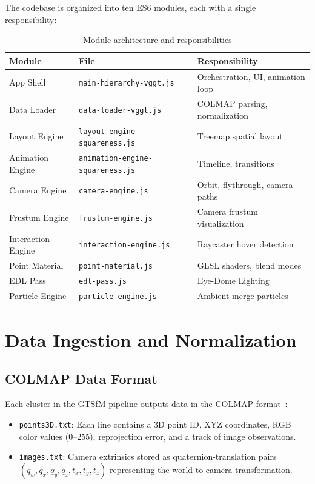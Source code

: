 \documentclass[11pt, letterpaper]{article}
\begin{document}
The codebase is organized into ten ES6 modules, each with a single responsibility:

\begin{table}[H]
\centering
\caption{Module architecture and responsibilities}
\begin{tabular}{@{}lll@{}}
\toprule
\textbf{Module} & \textbf{File} & \textbf{Responsibility} \\
\midrule
App Shell & \texttt{main-hierarchy-vggt.js} & Orchestration, UI, animation loop \\
Data Loader & \texttt{data-loader-vggt.js} & COLMAP parsing, normalization \\
Layout Engine & \texttt{layout-engine-squareness.js} & Treemap spatial layout \\
Animation Engine & \texttt{animation-engine-squareness.js} & Timeline, transitions \\
Camera Engine & \texttt{camera-engine.js} & Orbit, flythrough, camera paths \\
Frustum Engine & \texttt{frustum-engine.js} & Camera frustum visualization \\
Interaction Engine & \texttt{interaction-engine.js} & Raycaster hover detection \\
Point Material & \texttt{point-material.js} & GLSL shaders, blend modes \\
EDL Pass & \texttt{edl-pass.js} & Eye-Dome Lighting \\
Particle Engine & \texttt{particle-engine.js} & Ambient merge particles \\
\bottomrule
\end{tabular}
\end{table}

\section{Data Ingestion and Normalization}

\subsection{COLMAP Data Format}

Each cluster in the GTSfM pipeline outputs data in the COLMAP format~\cite{colmap}:

\begin{itemize}
    \item \texttt{points3D.txt}: Each line contains a 3D point ID, XYZ coordinates, RGB color values (0--255), reprojection error, and a track of image observations.
    \item \texttt{images.txt}: Camera extrinsics stored as quaternion-translation pairs $(q_w, q_x, q_y, q_z, t_x, t_y, t_z)$ representing the world-to-camera transformation.
\end{itemize}
\end{document}
